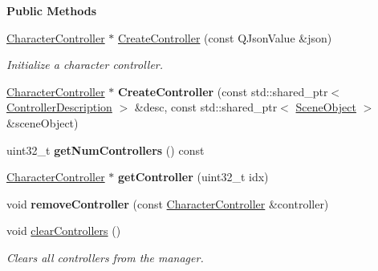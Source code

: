 \begin{Indent}\textbf{ Public Methods}\par
\begin{DoxyCompactItemize}
\item 
\mbox{\label{classrev_1_1_c_c_t_manager_a37b2293bcbb88bfdff22358dfcdf2585}} 
\mbox{\hyperlink{classrev_1_1_character_controller}{Character\+Controller}} $\ast$ \mbox{\hyperlink{classrev_1_1_c_c_t_manager_a37b2293bcbb88bfdff22358dfcdf2585}{Create\+Controller}} (const Q\+Json\+Value \&json)
\begin{DoxyCompactList}\small\item\em Initialize a character controller. \end{DoxyCompactList}\item 
\mbox{\label{classrev_1_1_c_c_t_manager_a4384656a33377004249dd78c7cb91ddb}} 
\mbox{\hyperlink{classrev_1_1_character_controller}{Character\+Controller}} $\ast$ {\bfseries Create\+Controller} (const std\+::shared\+\_\+ptr$<$ \mbox{\hyperlink{classrev_1_1_controller_description}{Controller\+Description}} $>$ \&desc, const std\+::shared\+\_\+ptr$<$ \mbox{\hyperlink{classrev_1_1_scene_object}{Scene\+Object}} $>$ \&scene\+Object)
\item 
\mbox{\label{classrev_1_1_c_c_t_manager_a15a1612d21baeea5093166f916fd6151}} 
uint32\+\_\+t {\bfseries get\+Num\+Controllers} () const
\item 
\mbox{\label{classrev_1_1_c_c_t_manager_a74392bf29accc20e598c085a0d2c7652}} 
\mbox{\hyperlink{classrev_1_1_character_controller}{Character\+Controller}} $\ast$ {\bfseries get\+Controller} (uint32\+\_\+t idx)
\item 
\mbox{\label{classrev_1_1_c_c_t_manager_a9a2f380449ddce258519ed7dd936a957}} 
void {\bfseries remove\+Controller} (const \mbox{\hyperlink{classrev_1_1_character_controller}{Character\+Controller}} \&controller)
\item 
\mbox{\label{classrev_1_1_c_c_t_manager_a46400d007bcd7008a54654c91333b433}} 
void \mbox{\hyperlink{classrev_1_1_c_c_t_manager_a46400d007bcd7008a54654c91333b433}{clear\+Controllers}} ()
\begin{DoxyCompactList}\small\item\em Clears all controllers from the manager. \end{DoxyCompactList}\item 

\end{DoxyCompactItemize}
\end{Indent}
